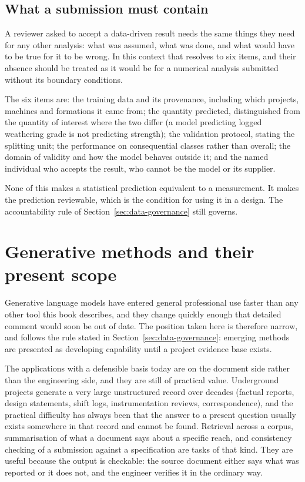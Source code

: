 \subsection{What a submission must contain}
\label{sec:ml-submission}

A reviewer asked to accept a data-driven result needs the same things they
need for any other analysis: what was assumed, what was done, and what would
have to be true for it to be wrong. In this context that resolves to six
items, and their absence should be treated as it would be for a numerical
analysis submitted without its boundary conditions.

The six items are: the training data and its provenance, including which projects,
machines and formations it came from; the quantity predicted, distinguished from
the quantity of interest where the two differ (a model predicting logged
weathering grade is not predicting strength); the validation protocol, stating
the splitting unit; the performance on consequential classes rather than
overall; the domain of validity and how the model behaves outside it; and the
named individual who accepts the result, who cannot be the model or
its supplier.

None of this makes a statistical prediction equivalent to a measurement.
It makes the prediction reviewable, which is the
condition for using it in a design. The accountability rule of
Section~\ref{sec:data-governance} still governs.

\section{Generative methods and their present scope}
\label{sec:generative-methods}

Generative language models have entered general professional use faster than any
other tool this book describes, and they change quickly enough that detailed
comment would soon be out of date.
The position taken here is therefore narrow, and follows the rule
stated in Section~\ref{sec:data-governance}: emerging methods are presented as
developing capability until a project evidence base exists.

The applications with a defensible basis today are on the document side rather
than the engineering side, and they are still of practical value. Underground projects
generate a very large unstructured record over decades (factual reports, design
statements, shift logs, instrumentation reviews, correspondence),
and the practical difficulty has always been that the answer to a
present question usually exists somewhere in that record and cannot be found.
Retrieval across a corpus, summarisation of what a document says
about a specific reach, and consistency checking of a submission against a
specification are tasks of that kind. They are useful because the
output is checkable: the source document either says what was reported or it
does not, and the engineer verifies it in the ordinary way.

